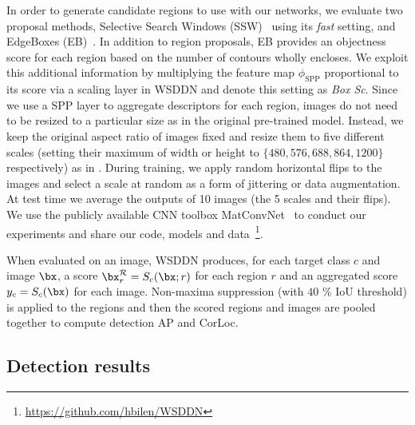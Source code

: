 In order to generate candidate regions to use with our networks, we evaluate two proposal methods, Selective Search Windows (SSW)~\cite{Sande11} using its \textit{fast} setting, and EdgeBoxes (EB)~\cite{Zitnick14}. In addition to region proposals, EB provides an objectness score for each region based on the number of contours wholly encloses. We exploit this additional information by multiplying the feature map $\phi_{\text{SPP}}$ proportional to its score via a scaling layer in WSDDN and denote this setting as \emph{Box Sc}. Since we use a SPP layer to aggregate descriptors for each region, images do not need to be resized to a particular size as in the original pre-trained model. Instead, we keep the original aspect ratio of images fixed and resize them to five different scales (setting their maximum of width or height to $\lbrace 480,576,688,864,1200\rbrace$ respectively) as in \cite{He14}. During training, we apply random horizontal flips to the images and select a scale at random as a form of jittering or data augmentation. At test time we average the outputs of 10 images (\ie the 5 scales and their flips). We use the publicly available CNN toolbox MatConvNet~\cite{Vedaldi15} to conduct our experiments and share our code, models and data~\footnote{\url{https://github.com/hbilen/WSDDN}}.

When evaluated on an image, WSDDN produces, for each target class $c$ and image $\bx$, a score $\bx^\mathcal{R}_r = S_c(\bx;r)$ for each region $r$ and an aggregated score $y_c=S_c(\bx)$ for each image. Non-maxima suppression (with $40$ \% IoU threshold) is applied to the regions and then the scored regions and images are pooled together to compute detection AP and CorLoc.








\subsection{Detection results}\label{s:detres}

